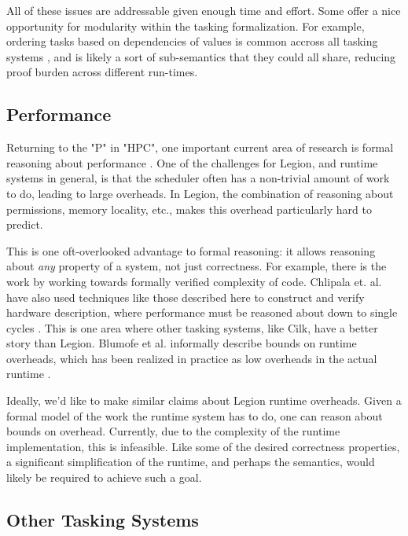 \documentclass[sigconf]{acmart}
\begin{document}
All of these issues are addressable given enough time and effort. Some offer
a nice opportunity for modularity within the tasking formalization. For example, 
ordering tasks based on dependencies of values is common accross all tasking
systems \cite{blumofe1995cilk, kaiser2014hpx}, and is likely a sort of sub-semantics that they could
all share, reducing proof burden across different run-times.

\subsection{Performance}

Returning to the "P" in "HPC", one important current area of research is formal
reasoning about performance \cite{performance}. One of the challenges for
Legion, and runtime systems in general, is that the scheduler often has a
non-trivial amount of work to do, leading to large overheads. In Legion, the
combination of reasoning about permissions, memory locality, etc., makes this
overhead particularly hard to predict. 

This is one oft-overlooked advantage to formal reasoning: it allows reasoning
about \emph{any} property of a system, not just correctness. For example, there
is the work by \cite{?} working towards formally verified complexity of code.
Chlipala et. al. have also used techniques like those described here to construct
and verify hardware description, where performance must be reasoned about down
to single cycles \cite{braibant2013formal}.  This is one area where other tasking
systems, like Cilk, have a better story than Legion. Blumofe et al. informally
describe bounds on runtime overheads, which has been realized in practice as
low overheads in the actual runtime \cite{blumofe1995cilk}. 

Ideally, we'd like to make similar claims about Legion runtime overheads.
Given a formal model of the work the runtime system has to do, one can reason
about bounds on overhead. Currently, due to the complexity of the runtime
implementation, this is infeasible. Like some of the desired correctness
properties, a significant simplification of the runtime, and perhaps the
semantics, would likely be required to achieve such a goal.


\subsection{Other Tasking Systems}
\end{document}
